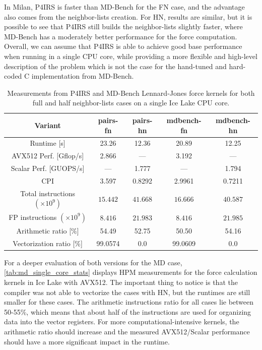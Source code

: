\documentclass[Afour,sageh,times]{sagej}
\newcommand{\second}{\mbox{s}}
\newcommand{\seconds}{\mbox{s}}
\newcommand{\flop}{\mbox{flop}}
\newcommand{\GFS}{\mbox{G\flop/\second}}
\begin{document}
In Milan, P4IRS is faster than MD-Bench for the \ac{FN} case, and the advantage also comes from the neighbor-lists creation.
For \ac{HN}, results are similar, but it is possible to see that P4IRS still builds the neighbor-lists slightly faster, where MD-Bench has a moderately better performance for the force computation.
Overall, we can assume that P4IRS is able to achieve good base performance when running in a single CPU core, while providing a more flexible and high-level description of the problem which is not the case for the hand-tuned and hard-coded C implementation from MD-Bench.

\begin{table}[htb]
    \centering
    \begin{tabular}{c|c|c|c|c}
        Variant & pairs-fn & pairs-hn & mdbench-fn & mdbench-hn \\
        \hline
        Runtime [\seconds] & 23.26 & 12.36 & 20.89 & 12.25 \\
        AVX512 Perf. [\GFS] & 2.866 & --- & 3.192 & --- \\
        Scalar Perf. [GUOPS/s] & --- & 1.777 & --- & 1.794 \\
        CPI & 3.597 & 0.8292 & 2.9961 & 0.7211 \\
        Total instructions $(\times 10^9)$ & $15.442$ & $41.668$ & $16.666$ & $40.587$ \\
        FP instructions $(\times 10^9)$ & $8.416$ & $21.983$ & $8.416$ & $21.985$ \\
        Arithmetic ratio [\%] & 54.49 & 52.75 & 50.50 & 54.16 \\
        Vectorization ratio [\%] & 99.0574 & 0.0 & 99.0609 & 0.0 \\
    \end{tabular}
    \caption{Measurements from P4IRS and MD-Bench Lennard-Jones force kernels for both full and half neighbor-lists cases on a single Ice Lake CPU core.}
    \label{tab:md_single_core_stats}
\end{table}

For a deeper evaluation of both versions for the \ac{MD} case, \autoref{tab:md_single_core_stats} displays HPM measurements for the force calculation kernels in Ice Lake with AVX512.
The important thing to notice is that the compiler was not able to vectorize the cases with \ac{HN}, but the runtimes are still smaller for these cases.
The arithmetic instructions ratio for all cases lie between 50-55\%, which means that about half of the instructions are used for organizing data into the vector registers.
For more computational-intensive kernels, the arithmetic ratio should increase and the measured AVX512/Scalar performance should have a more significant impact in the runtime.
\end{document}
